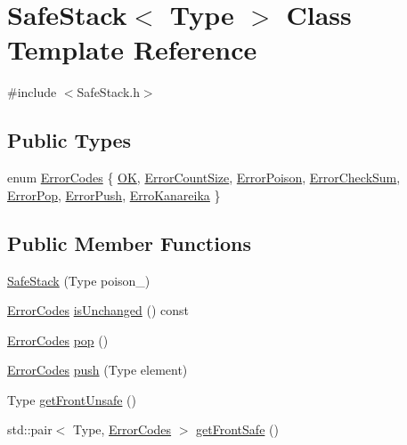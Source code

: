\hypertarget{classSafeStack}{}\section{Safe\+Stack$<$ Type $>$ Class Template Reference}
\label{classSafeStack}


{\ttfamily \#include $<$Safe\+Stack.\+h$>$}

\subsection*{Public Types}
\begin{DoxyCompactItemize}
\item 
enum \hyperlink{classSafeStack_a3a6ee072918bd0a2c09fa0ea12c1ab64}{Error\+Codes} \{ \newline
\hyperlink{classSafeStack_a3a6ee072918bd0a2c09fa0ea12c1ab64a93f2888c3bca456c946b0ccab748c528}{OK}, 
\hyperlink{classSafeStack_a3a6ee072918bd0a2c09fa0ea12c1ab64a0c945d7ee858c618581c0880fa9c90ec}{Error\+Count\+Size}, 
\hyperlink{classSafeStack_a3a6ee072918bd0a2c09fa0ea12c1ab64a1dae85291dc4c12d33f7a19f5691428b}{Error\+Poison}, 
\hyperlink{classSafeStack_a3a6ee072918bd0a2c09fa0ea12c1ab64ab01666e8811782433f76bb840a9546db}{Error\+Check\+Sum}, 
\newline
\hyperlink{classSafeStack_a3a6ee072918bd0a2c09fa0ea12c1ab64ad5ec78a91bea5a0c4287a33bf641694d}{Error\+Pop}, 
\hyperlink{classSafeStack_a3a6ee072918bd0a2c09fa0ea12c1ab64a604e5836364af75dcb5fadf5b8bb158d}{Error\+Push}, 
\hyperlink{classSafeStack_a3a6ee072918bd0a2c09fa0ea12c1ab64a4b7d6f3ca4bc8af6d813a8e9b97f1592}{Erro\+Kanareika}
 \}
\end{DoxyCompactItemize}
\subsection*{Public Member Functions}
\begin{DoxyCompactItemize}
\item 
\hyperlink{classSafeStack_a09eef1ed7a4e2b0486d4991bc23ea78f}{Safe\+Stack} (Type poison\+\_\+)
\item 
\hyperlink{classSafeStack_a3a6ee072918bd0a2c09fa0ea12c1ab64}{Error\+Codes} \hyperlink{classSafeStack_a6ba7568bccbbd336aa7f6ee6102cd411}{is\+Unchanged} () const
\item 
\hyperlink{classSafeStack_a3a6ee072918bd0a2c09fa0ea12c1ab64}{Error\+Codes} \hyperlink{classSafeStack_a7add18e30f467b9b08233feeed6544df}{pop} ()
\item 
\hyperlink{classSafeStack_a3a6ee072918bd0a2c09fa0ea12c1ab64}{Error\+Codes} \hyperlink{classSafeStack_a4ecd17feae41fe142535f281a80a6a6c}{push} (Type element)
\item 
Type \hyperlink{classSafeStack_ad3ebe85bc788378690144800418e761d}{get\+Front\+Unsafe} ()
\item 
std\+::pair$<$ Type, \hyperlink{classSafeStack_a3a6ee072918bd0a2c09fa0ea12c1ab64}{Error\+Codes} $>$ \hyperlink{classSafeStack_a5b4c56ff55c462bd746f4f36258d46e0}{get\+Front\+Safe} ()
\end{DoxyCompactItemize}


